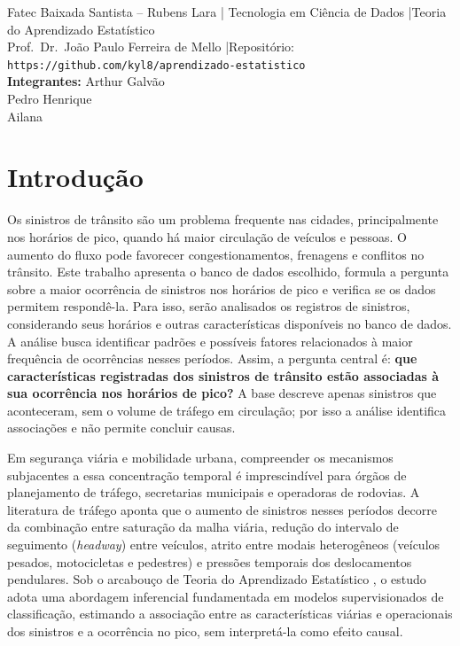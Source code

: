 \documentclass[
  article,
  12pt,
  oneside,
  a4paper,
  english,
  brazil
]{abntex2}\usepackage[]{graphicx}\usepackage[]{xcolor}
\newcommand{\nomecurso}{Tecnologia em Ciência de Dados}
\newcommand{\nomedisciplina}{Teoria do Aprendizado Estatístico}
\newcommand{\nomeprofessor}{Prof.\ Dr.\ João Paulo Ferreira de Mello}
\newcommand{\repositorio}{https://github.com/kyl8/aprendizado-estatistico}
\newcommand{\integrantes}{%
  Arthur Galvão \\
  Pedro Henrique \\
  Ailana%
}
\begin{document}
\frenchspacing

\maketitle

\begin{center}
  \footnotesize
  Fatec Baixada Santista -- Rubens Lara \quad|\quad
  \nomecurso{} \quad|\quad \nomedisciplina{} \\[0.2em]
  \nomeprofessor{} \quad|\quad Repositório: \texttt{\repositorio} \\[0.2em]
  \textbf{Integrantes:} \integrantes
\end{center}

\textual

\section{Introdução}

Os sinistros de trânsito são um problema frequente nas cidades, principalmente nos horários de pico, quando há maior circulação de veículos e pessoas. O aumento do fluxo pode favorecer congestionamentos, frenagens e conflitos no trânsito. Este trabalho apresenta o banco de dados escolhido, formula a pergunta sobre a maior ocorrência de sinistros nos horários de pico e verifica se os dados permitem respondê-la. Para isso, serão analisados os registros de sinistros, considerando seus horários e outras características disponíveis no banco de dados. A análise busca identificar padrões e possíveis fatores relacionados à maior frequência de ocorrências nesses períodos. Assim, a pergunta central é: \textbf{que características registradas dos sinistros de trânsito estão associadas à sua ocorrência nos horários de pico?} A base descreve apenas sinistros que aconteceram, sem o volume de tráfego em circulação; por isso a análise identifica associações e não permite concluir causas.

Em segurança viária e mobilidade urbana, compreender os mecanismos subjacentes a essa concentração temporal é imprescindível para órgãos de planejamento de tráfego, secretarias municipais e operadoras de rodovias. A literatura de tráfego aponta que o aumento de sinistros nesses períodos decorre da combinação entre saturação da malha viária, redução do intervalo de seguimento (\textit{headway}) entre veículos, atrito entre modais heterogêneos (veículos pesados, motocicletas e pedestres) e pressões temporais dos deslocamentos pendulares. Sob o arcabouço de Teoria do Aprendizado Estatístico \cite{james2021}, o estudo adota uma abordagem inferencial fundamentada em modelos supervisionados de classificação, estimando a associação entre as características viárias e operacionais dos sinistros e a ocorrência no pico, sem interpretá-la como efeito causal.
\end{document}
